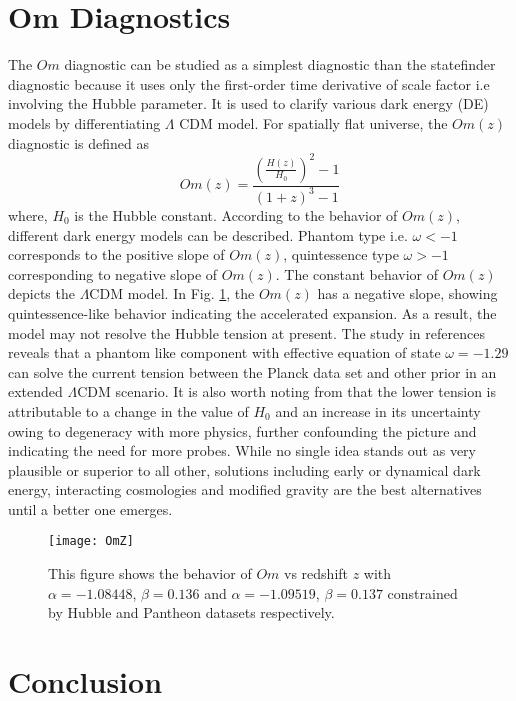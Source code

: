 \section{Om Diagnostics} \label{sec5}

The $Om$ diagnostic can be studied as a simplest diagnostic than the statefinder diagnostic \cite{Sahni/2008,Shahalam/2015} because it uses only the first-order time derivative of scale factor i.e involving the Hubble parameter. It is used to clarify various dark energy (DE) models by differentiating $\Lambda$ CDM model. For spatially flat universe, the $Om(z)$ diagnostic is defined as
\begin{equation}
Om\left(z\right)=\frac{\left(\frac{H\left(z\right)}{H_0}\right)^2-1}{\left(1+z\right)^3-1}
\end{equation} 
where, $H_0$ is the Hubble constant.
According to the behavior of $Om(z)$, different dark energy models can be described. Phantom type i.e. $\omega < -1$ corresponds to the positive slope of $Om(z)$, quintessence type $\omega > -1$ corresponding to negative slope of $Om(z)$. The constant behavior of $Om(z)$ depicts the $\Lambda$CDM model.
In Fig. \ref{fig-9}, the $Om(z)$ has a negative slope, showing quintessence-like behavior indicating the accelerated expansion. As a result, the model may not resolve the Hubble tension at present. The study in references \cite{Vagnozzi/2020,Valentino/2016} reveals that a phantom like component with effective equation of state $\omega = -1.29$ can solve the current tension between the Planck data set and other prior in an extended $\Lambda$CDM scenario. It is also worth noting from \cite{Valentino/2021} that the lower tension is attributable to a change in the value of $H_{0}$ and an increase in its uncertainty owing to degeneracy with more physics, further confounding the picture and indicating the need for more probes. While no single idea stands out as very plausible or superior to all other, solutions including early or dynamical dark energy, interacting cosmologies and modified gravity are the best alternatives until a better one emerges.

\begin{figure}[H]
\centering
\texttt{[image: OmZ]}
\caption{This figure shows the behavior of $Om$ vs redshift $z$ with $\alpha=-1.08448$, $\beta=0.136$ and $\alpha=-1.09519$, $\beta=0.137$ constrained by Hubble and Pantheon datasets respectively.} \label{fig-9}
\end{figure}

\section{Conclusion}\label{sec6}

